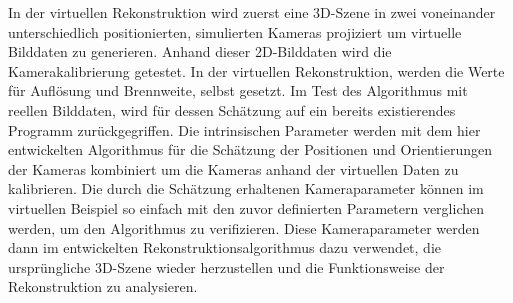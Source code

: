 In der virtuellen Rekonstruktion wird zuerst eine 3D-Szene in zwei voneinander unterschiedlich positionierten, simulierten Kameras projiziert um virtuelle Bilddaten zu generieren. Anhand dieser 2D-Bilddaten wird die Kamerakalibrierung getestet. In der virtuellen Rekonstruktion, werden die Werte für Auflösung und Brennweite, selbst gesetzt. Im Test des Algorithmus mit reellen Bilddaten, wird für dessen Schätzung auf ein bereits existierendes Programm zurückgegriffen. Die intrinsischen Parameter werden mit dem hier entwickelten Algorithmus für die Schätzung der Positionen und Orientierungen der Kameras kombiniert um die Kameras anhand der virtuellen Daten zu kalibrieren. Die durch die Schätzung erhaltenen Kameraparameter können im virtuellen Beispiel so einfach mit den zuvor definierten Parametern verglichen werden, um den Algorithmus zu verifizieren. Diese Kameraparameter werden dann im entwickelten Rekonstruktionsalgorithmus dazu verwendet, die ursprüngliche 3D-Szene wieder herzustellen und die Funktionsweise der Rekonstruktion zu analysieren. \\



